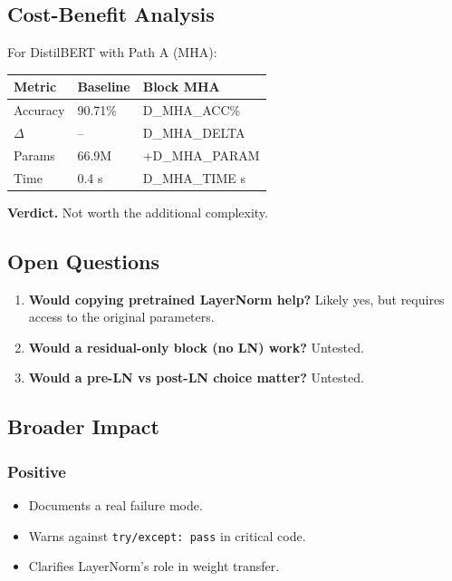 \subsection{Cost-Benefit Analysis}

For DistilBERT with Path A (MHA):

\begin{table}[H]
\centering
\small
\begin{tabular}{lll}
\toprule
\textbf{Metric} & \textbf{Baseline} & \textbf{Block MHA} \\
\midrule
Accuracy & 90.71\% & {{D\_MHA\_ACC}}\% \\
$\Delta$ & -- & {{D\_MHA\_DELTA}} \\
Params & 66.9M & +{{D\_MHA\_PARAM}} \\
Time & 0.4 s & {{D\_MHA\_TIME}} s \\
\bottomrule
\end{tabular}
\end{table}

\textbf{Verdict.} Not worth the additional complexity.

\subsection{Open Questions}

\begin{enumerate}
\item \textbf{Would copying pretrained LayerNorm help?} Likely yes, but requires
  access to the original parameters.
\item \textbf{Would a residual-only block (no LN) work?} Untested.
\item \textbf{Would a pre-LN vs post-LN choice matter?} Untested.

\end{enumerate}
\subsection{Broader Impact}

\subsubsection{Positive}

\begin{itemize}
\item Documents a real failure mode.
\item Warns against \texttt{try/except: pass} in critical code.
\item Clarifies LayerNorm's role in weight transfer.

\end{itemize}
